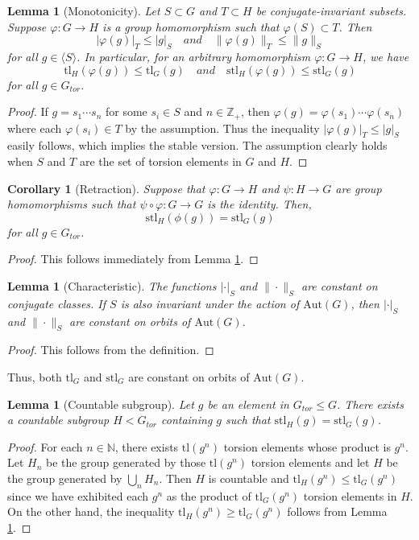 \documentclass{amsart}
\newtheorem{lemma}[theorem]{Lemma}
\newtheorem{corollary}[theorem]{Corollary}
\theoremstyle{definition}
\newcommand{\nn}{\mathbb{N}}
\numberwithin{equation}{section}
\theoremstyle{theorem}
\theoremstyle{remark}
\def\Z{\mathbb Z}
\def\Aut{\mathrm{Aut}}
\def\tl{\mathrm{tl}}
\def\stl{\mathrm{stl}}
\def\Gt{G_{tor}}
\begin{document}
	\begin{lemma}[Monotonicity] \label{lemma: monotone} 
		Let $S\subset G$ and $T\subset H$ be conjugate-invariant subsets.
		Suppose $\varphi:G\to H$ is a group homomorphism such that $\varphi(S)\subset T$. 
		Then
		$$|\varphi(g)|_T \le |g|_S \quad and \quad \|\varphi(g)\|_T \le \|g\|_S$$
		for all $g\in \langle S\rangle$.
		In particular, for an arbitrary homomorphism $\varphi: G\to H$, we have
		$$\tl_H(\varphi(g))\leq \tl_G(g)\quad and \quad \stl_H(\varphi(g))\leq \stl_G(g)$$ for all $g\in \Gt$.
	\end{lemma}
	\begin{proof}
		If $g=s_1\cdots s_n$ for some $s_i\in S$ and $n\in\Z_+$, then $\varphi(g)=\varphi(s_1)\cdots\varphi(s_n)$ where each $\varphi(s_i)\in T$ by the assumption. Thus the inequality $|\varphi(g)|_T \le |g|_S$ easily follows, which implies the stable version. The assumption clearly holds when $S$ and $T$ are the set of torsion elements in $G$ and $H$.
	\end{proof}
	
	\begin{corollary}[Retraction]\label{cor: retract}
		Suppose that $\varphi:G\to H$ and $\psi:H\to G$ are group homomorphisms such that $\psi \circ \varphi: G\to G$ is the identity. Then, 
		$$\stl_H(\phi(g))=\stl_G(g)
		$$
		for all $g\in \Gt$.
	\end{corollary}
	\begin{proof}
		This follows immediately from Lemma \ref{lemma: monotone}. 
	\end{proof}
	
	\begin{lemma}[Characteristic]
		The functions $|\cdot|_S$ and $\|\cdot\|_S$ are constant on conjugate classes.
		If $S$ is also invariant under the action of $\Aut(G)$, then
		$|\cdot|_S$ and $\|\cdot\|_S$ are constant on orbits of $\Aut(G)$. 
	\end{lemma}
	\begin{proof}
		This follows from the definition.
	\end{proof}
	
	Thus, both $\tl_G$ and $\stl_G$ are constant on orbits of $\Aut(G)$. 
	
	\begin{lemma}[Countable subgroup] 
		Let $g$ be an element in $\Gt\le G$. There exists a countable subgroup $H<\Gt$ containing $g$ such that $\stl_H(g)=\stl_G (g)$. 
	\end{lemma}
	\begin{proof}
		For each $n\in \nn$, there exists $\tl(g^n)$ torsion elements whose product is $g^n$. Let $H_n$ be the group generated by those $\tl(g^n)$ torsion elements and let $H$ be the group generated by $\bigcup_n H_n$. Then $H$ is countable and $\tl_{H}(g^n)\leq\tl_{G}(g^n)$ since we have exhibited each $g^n$ as the product of $\tl_{G}(g^n)$ torsion elements in $H$. On the other hand, the inequality $\tl_{H}(g^n)\geq\tl_{G}(g^n)$ follows from Lemma \ref{lemma: monotone}.   
	\end{proof}
	
\end{document}
